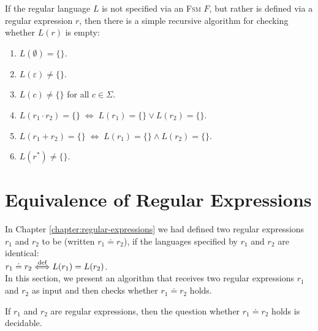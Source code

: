 \remarkEng
If the regular language  $L$ is not specified via an \textsc{Fsm} $F$, but rather is defined
via a regular expression $r$, then there is a simple recursive algorithm for checking whether 
$L(r)$ is empty:
\begin{enumerate}
\item $L(\emptyset) = \{\}$.
\item $L(\varepsilon) \not= \{\}$.
\item $L(c) \not= \{\}$ \quad for all $c \in \Sigma$.
\item $L(r_1 \cdot r_2) = \{\} \;\Leftrightarrow\; L(r_1) = \{\} \vee L(r_2) = \{\}$.
\item $L(r_1 + r_2) = \{\} \;\Leftrightarrow\; L(r_1) = \{\} \wedge L(r_2) = \{\}$.
\item $L(r^*) \not= \{\}$. \eox
\end{enumerate}


\section{Equivalence of Regular Expressions}
In Chapter \ref{chapter:regular-expressions} we had defined two regular expressions $r_1$ and $r_2$ to be  
(written $r_1 \doteq r_2$), if the languages specified by $r_1$ and $r_2$ are identical:
\\[0.2cm]
\hspace*{1.3cm}
$r_1 \doteq r_2 \stackrel{\mbox{\scriptsize def}}{\Longleftrightarrow} L(r_1) = L(r_2)$. 
\\[0.2cm]
In this section, we present an algorithm that receives two regular expressions $r_1$ and $r_2$ as input and then
checks whether $r_1 \doteq r_2$ holds. 


\begin{Theorem}
  If $r_1$ and $r_2$ are regular expressions, then the question whether $r_1 \doteq r_2$ holds is decidable.
\end{Theorem}

